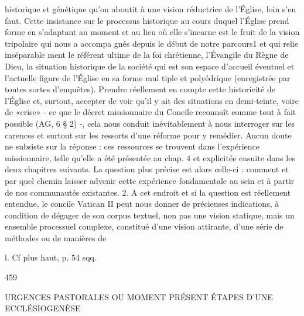 {historique et génétique qu'on aboutit à une vision réductrice de l'Église, loin s'en faut.
Cette insistance sur le processus historique au cours duquel l'Église prend forme en s'adaptant au moment et au lieu où elle s'incarne est le fruit de la vision tripolaire qui nous a accompa­ gnés depuis le début de notre parcours1 et qui relie inséparable­ ment le référent ultime de la foi chrétienne, l'Évangile du Règne de Dieu, la situation historique de la société qui est son espace d'accueil éventuel et l'actuelle figure de l'Église en sa forme mul­ tiple et polyédrique (enregistrée par toutes sortes d'enquêtes). Prendre réellement en compte cette historicité de l'Église et, surtout, accepter de voir qu'il y ait des situations en demi-teinte, voire de «crise» - ce que le décret missionnaire du Concile reconnaît comme tout à fait possible (AG, 6 § 2) -, cela nous conduit inévitablement à nous interroger sur les carences et surtout sur les ressorts d'une réforme pour y remédier. Aucun doute ne subsiste sur la réponse : ces ressources se trouvent dans l'expérience missionnaire, telle qu'elle a été présentée au chap. 4 et explicitée ensuite dans les deux chapitres suivants. La question plus précise est alors celle-ci : comment et par quel chemin laisser advenir cette expérience fondamentale au sein et à partir de nos communautés existantes.
2.	A cet endroit et si la question est réellement entendue, le concile Vatican II peut nous donner de précieuses indications, à condition de dégager de son corpus textuel, non pas une vision statique, mais un ensemble processuel complexe, constitué d'une vision attirante, d'une série de méthodes ou de manières de

l. Cf plus haut, p. 54 sqq.

459
 
URGENCES PASTORALES OU MOMENT PRÉSENT	ÉTAPES D'UNE ECCLÉSIOGENÈSE

}
